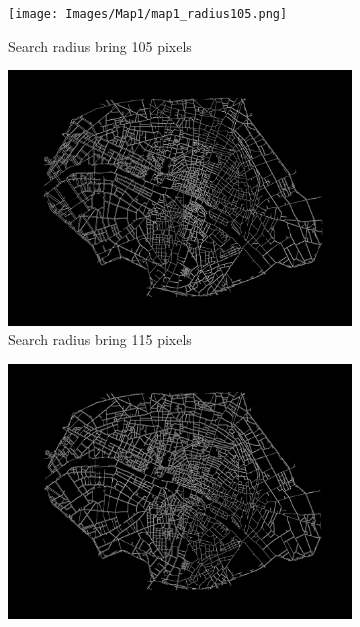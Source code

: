 \begin{figure}[h!]
     \centering
     \begin{subfigure}{0.48\textwidth}
         \centering
         \texttt{[image: Images/Map1/map1\_radius105.png]}
         \caption{Search radius bring 105 pixels}
     \end{subfigure}
     \hfill
     \begin{subfigure}{0.48\textwidth}
         \centering
         \includegraphics[width=\textwidth]{Images/Map1/map1_radius115.png}
         \caption{Search radius bring 115 pixels}
     \end{subfigure}
     \hfill
     \begin{subfigure}{0.48\textwidth}
         \centering
         \includegraphics[width=\textwidth]{Images/Map1/map1_radius120.png}

\end{subfigure}
\end{figure}
